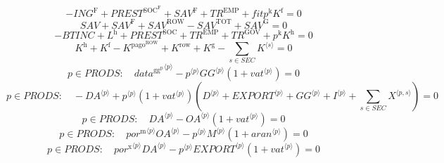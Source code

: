 \begin{equation}
-{I\!N\!G}^{\mathrm{F}} + {P\!R\!E\!S\!T}^{\mathrm{SOC}^{\mathrm{F}}} + {S\!A\!V}^{\mathrm{F}} + {T\!R}^{\mathrm{EMP}} + {{f\!i\!t}} {p^{\mathrm{k}}} {K^{\mathrm{f}}} = 0
\end{equation}
\begin{equation}
{S\!A\!V} + {S\!A\!V}^{\mathrm{F}} + {S\!A\!V}^{\mathrm{ROW}} - {S\!A\!V}^{\mathrm{TOT}} + {S\!A\!V}^{\mathrm{G}} = 0
\end{equation}
\begin{equation}
-{B\!T\!I\!N\!C} + L^{\mathrm{h}} + {P\!R\!E\!S\!T}^{\mathrm{SOC}} + {T\!R}^{\mathrm{EMP}} + {T\!R}^{\mathrm{GOV}} + {p^{\mathrm{k}}} {K^{\mathrm{h}}} = 0
\end{equation}
\begin{equation}
K^{\mathrm{h}} + K^{\mathrm{f}} - K^{\mathrm{pago}^{\mathrm{ROW}}} + K^{\mathrm{row}} + K^{\mathrm{g}} - \sum_{s\in {S\!E\!C}} {K}^{\langle s\rangle} = 0
\end{equation}
\begin{equation}
p\in {P\!R\!O\!D\!S}\colon\quad {{d\!a\!t\!a}^{\mathrm{gg}^{\mathrm{p}}}}^{\langle p\rangle} - {{p}^{\langle p\rangle}} {{{G\!G}}^{\langle p\rangle}} \left(1 + {{v\!a\!t}}^{\langle p\rangle}\right) = 0
\end{equation}
\begin{equation}
p\in {P\!R\!O\!D\!S}\colon\quad -{{D\!A}}^{\langle p\rangle} + {{p}^{\langle p\rangle}} \left(1 + {{v\!a\!t}}^{\langle p\rangle}\right) \left({D}^{\langle p\rangle} + {{E\!X\!P\!O\!R\!T}}^{\langle p\rangle} + {{G\!G}}^{\langle p\rangle} + {I}^{\langle p\rangle} + \sum_{s\in {S\!E\!C}} {X}^{\langle p,s\rangle}\right) = 0
\end{equation}
\begin{equation}
p\in {P\!R\!O\!D\!S}\colon\quad {{D\!A}}^{\langle p\rangle} - {{{O\!A}}^{\langle p\rangle}} \left(1 + {{v\!a\!t}}^{\langle p\rangle}\right) = 0
\end{equation}
\begin{equation}
p\in {P\!R\!O\!D\!S}\colon\quad {{{p\!o\!r}^{\mathrm{m}}}^{\langle p\rangle}} {{{O\!A}}^{\langle p\rangle}} - {{p}^{\langle p\rangle}} {{M}^{\langle p\rangle}} \left(1 + {{a\!r\!a\!n}}^{\langle p\rangle}\right) = 0
\end{equation}
\begin{equation}
p\in {P\!R\!O\!D\!S}\colon\quad {{{p\!o\!r}^{\mathrm{x}}}^{\langle p\rangle}} {{{D\!A}}^{\langle p\rangle}} - {{p}^{\langle p\rangle}} {{{E\!X\!P\!O\!R\!T}}^{\langle p\rangle}} \left(1 + {{v\!a\!t}}^{\langle p\rangle}\right) = 0
\end{equation}
